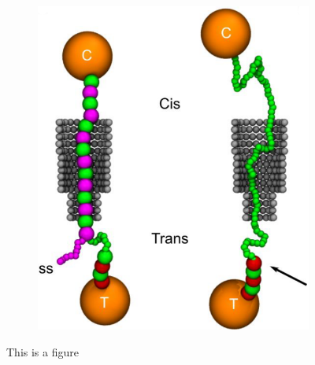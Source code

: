 \begin{figure}[ht]
\begin{centering}
\begin{subfigure}[t]{\dimexpr.5\linewidth-1.3em\relax}
  \includegraphics[width=0.9\linewidth,valign=t]{Figures/Stefanos2.png}
  \end{subfigure}
  \caption{This is a figure}
  \label{fig:test}
  \end{centering}
\end{figure}

